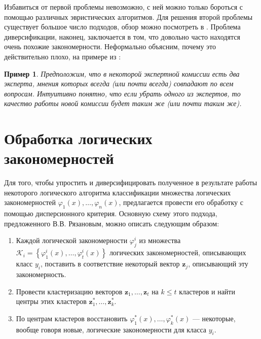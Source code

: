 \documentclass[12pt]{article}
\newtheorem{example}{Пример}
\begin{document}
Избавиться от первой проблемы невозможно, с ней можно только бороться
с помощью различных эвристических алгоритмов. Для решения второй
проблемы существует большое число подходов, обзор можно посмотреть в
\cite{furnkranz97pruning}. Проблема диверсификации, наконец,
заключается в том, что довольно часто находятся очень похожие
закономерности. Неформально объясним, почему это действительно плохо,
на примере из \cite{voron10logicalgs}:

\begin{example}
  Предположим, что в некоторой экспертной комиссии есть два эксперта,
  мнения которых всегда (или почти всегда) совпадают по всем
  вопросам. Интуитивно понятно, что если убрать одного из экспертов,
  то качество работы новой комиссии будет таким же (или почти таким
  же).
\end{example}

\section{Обработка логических закономерностей}



Для того, чтобы упростить и диверсифицировать полученное в результате
работы некоторого логического алгоритма классификации множества
логических закономерностей \(\varphi_1(x), \dots, \varphi_n(x)\),
предлагается провести его обработку с помощью дисперсионного критерия.
Основную схему этого подхода, предложенного В.В. Рязановым, можно
описать следующим образом:

\begin{enumerate}
\item Каждой логической закономерности \(\varphi_j^i\) из множества
  \(
  \mathcal{K}_{i} = \left\{
  \varphi_1^i(x), \dots, \varphi_t^i(x)
  \right\}
  \)
  логических закономерностей, описывающих класс \(y_i\), поставить в
  соответствие некоторый вектор \(\bm{z}_j\), описывающий эту
  закономерность.
\item Провести кластеризацию векторов \(\bm{z}_1, \dots, \bm{z}_t\) на
  \(k \leq t\) кластеров и найти центры этих кластеров
  \(\bm{z}_1^*, \dots, \bm{z}_k^*\).
\item По центрам кластеров восстановить \(\varphi_1^*(x), \dots,
  \varphi_k^*(x)\) --- некоторые, вообще говоря новые, логические
  закономерности для класса \(y_i\).
\end{enumerate}
\end{document}
